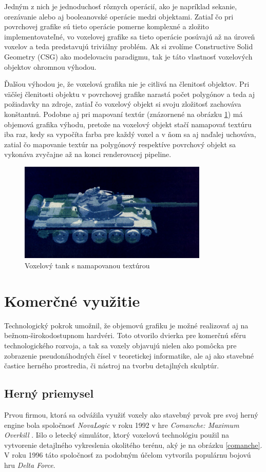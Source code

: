 Jedným z nich je jednoduchosť rôznych operácií, ako je napríklad sekanie, orezávanie alebo aj booleanovské operácie medzi objektami. Zatiaľ čo pri povrchovej grafike sú tieto operácie pomerne komplexné a zložito implementovateľné, vo voxelovej grafike sa tieto operácie posúvajú až na úroveň voxelov a teda predstavujú triviálny problém. Ak si zvolíme Constructive Solid Geometry (CSG) ako modelovaciu paradigmu, tak je táto vlastnosť voxelových objektov ohromnou výhodou.

Ďalšou výhodou je, že voxelová grafika nie je citlivá na členitosť objektov. Pri väčšej členitosti objektu v povrchovej grafike narastá počet polygónov a teda aj požiadavky na zdroje, zatiaľ čo voxelový objekt si svoju zložitosť zachováva konštantnú. Podobne aj pri mapovaní textúr (znázornené na obrázku \ref{tank}) má objemová grafika výhodu, pretože na voxelový objekt stačí namapovať textúru iba raz, kedy sa vypočíta farba pre každý voxel a v ňom sa aj naďalej uchováva, zatial čo mapovanie textúr na polygónový respektíve povrchový objekt sa vykonáva zvyčajne až na konci renderovacej pipeline.

\begin{figure}[ht!]
	\centering
	\includegraphics[width=90mm]{tank.jpg}
	\caption[Voxelový tank s namapovanou textúrou]{Voxelový tank s namapovanou textúrou}
	\label{tank}
\end{figure}

\eject

\section{Komerčné využitie}
Technologický pokrok umožnil, že objemovú grafiku je možné realizovať aj na bežnom-širokodostupnom hardvéri. Toto otvorilo dvierka pre komerčnú sféru technologického rozvoja, a tak sa voxely objavujú nielen ako pomôcka pre zobrazenie pseudonáhodných čísel v teoretickej informatike, ale aj ako stavebné častice herného prostredia, či nástroj na tvorbu detajlných skulptúr.

\subsection{Herný priemysel}
Prvou firmou, ktorá sa odvážila využiť voxely ako stavebný prvok pre svoj herný engine bola spoločnosť \textit{NovaLogic} v roku 1992 v hre \textit{Comanche: Maximum Overkill} \cite{VoxelGames} . Išlo o letecký simulátor, ktorý voxelovú technológiu použil na vytvorenie detajlného vykreslenia okolitého terénu, aký je na obrázku \ref{comanche}. V roku 1996 táto spoločnosť za podobným účelom vytvorila populárnu bojovú hru \textit{Delta Force}.

